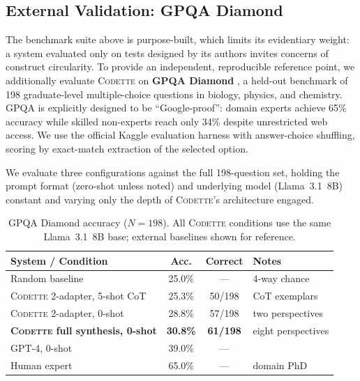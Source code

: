 \documentclass[11pt,a4paper]{article}
\newcommand{\codette}{\textsc{Codette}}
\begin{document}
\subsection{External Validation: GPQA Diamond}
\label{sec:gpqa}

The benchmark suite above is purpose-built, which limits its evidentiary
weight: a system evaluated only on tests designed by its authors invites
concerns of construct circularity. To provide an independent, reproducible
reference point, we additionally evaluate \codette{} on \textbf{GPQA Diamond}
\citep{rein2023gpqa}, a held-out benchmark of 198 graduate-level multiple-choice
questions in biology, physics, and chemistry. GPQA is explicitly designed to be
``Google-proof'': domain experts achieve 65\% accuracy while skilled non-experts
reach only 34\% despite unrestricted web access. We use the official Kaggle
evaluation harness with answer-choice shuffling, scoring by exact-match
extraction of the selected option.

We evaluate three configurations against the full 198-question set, holding the
prompt format (zero-shot unless noted) and underlying model (Llama~3.1~8B)
constant and varying only the depth of \codette{}'s architecture engaged.

\begin{table}[ht]
\centering
\caption{GPQA Diamond accuracy ($N=198$). All \codette{} conditions use the
same Llama~3.1~8B base; external baselines shown for reference.}
\label{tab:gpqa}
\begin{tabular}{lccl}
\toprule
\textbf{System / Condition} & \textbf{Acc.} & \textbf{Correct} & \textbf{Notes} \\
\midrule
Random baseline                  & 25.0\% & ---     & 4-way chance \\
\codette{} 2-adapter, 5-shot CoT & 25.3\% & 50/198  & CoT exemplars \\
\codette{} 2-adapter, 0-shot     & 28.8\% & 57/198  & two perspectives \\
\textbf{\codette{} full synthesis, 0-shot}
                                 & \textbf{30.8\%} & \textbf{61/198} & eight perspectives \\
\midrule
GPT-4, 0-shot                    & 39.0\% & ---     & \citep{rein2023gpqa} \\
Human expert                     & 65.0\% & ---     & domain PhD \\
\bottomrule
\end{tabular}
\end{table}
\end{document}
